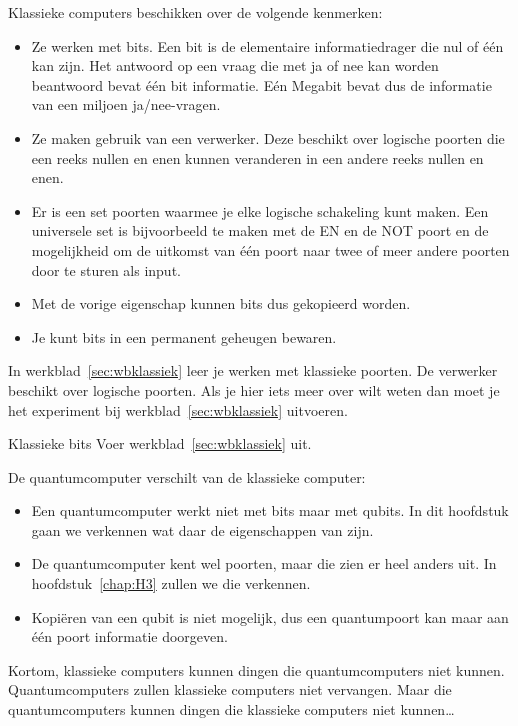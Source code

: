 \documentclass[../../main.tex]{subfiles}
\begin{document}
Klassieke computers beschikken over de volgende kenmerken:
\begin{itemize}
\item Ze werken met bits. Een bit is de elementaire informatiedrager die nul of \'e\'en kan zijn. Het antwoord op een vraag die met ja of nee kan worden beantwoord bevat \'e\'en bit informatie. E\'en Megabit bevat dus de informatie van een miljoen ja/nee-vragen.  
\item Ze maken gebruik van een verwerker. Deze beschikt over logische poorten die een reeks nullen en enen kunnen veranderen in een andere reeks nullen en enen.
\item Er is een set poorten waarmee je elke logische schakeling kunt maken. Een universele set is bijvoorbeeld te maken met de EN en de NOT poort en de mogelijkheid om de uitkomst van \'e\'en poort naar twee of meer andere poorten door te sturen als input. 
\item Met de vorige eigenschap kunnen bits dus gekopieerd worden. 
\item Je kunt bits in een permanent geheugen bewaren. 
\end{itemize}

 In werkblad~\ref{sec:wbklassiek} leer je werken met klassieke poorten. De verwerker beschikt over logische poorten. Als je hier iets meer over wilt weten dan moet je het experiment bij werkblad~\ref{sec:wbklassiek} uitvoeren.

\begin{experiment}{Klassieke bits}
Voer werkblad~\ref{sec:wbklassiek} uit.
\end{experiment}

De quantumcomputer verschilt van de klassieke computer:
\begin{itemize}

\item Een quantumcomputer werkt niet met bits maar met qubits. In dit hoofdstuk gaan we verkennen wat daar de eigenschappen van zijn. 
\item De quantumcomputer kent wel poorten, maar die zien er heel anders uit. In hoofdstuk~\ref{chap:H3} zullen we die verkennen. 
\item Kopi\"eren van een qubit is niet mogelijk, dus een quantumpoort kan maar aan \'e\'en poort informatie doorgeven.
\end{itemize}

Kortom, klassieke computers kunnen dingen die quantumcomputers niet kunnen. Quantumcomputers zullen klassieke computers niet vervangen. Maar die quantumcomputers kunnen dingen die klassieke computers niet kunnen\ldots
\end{document}
